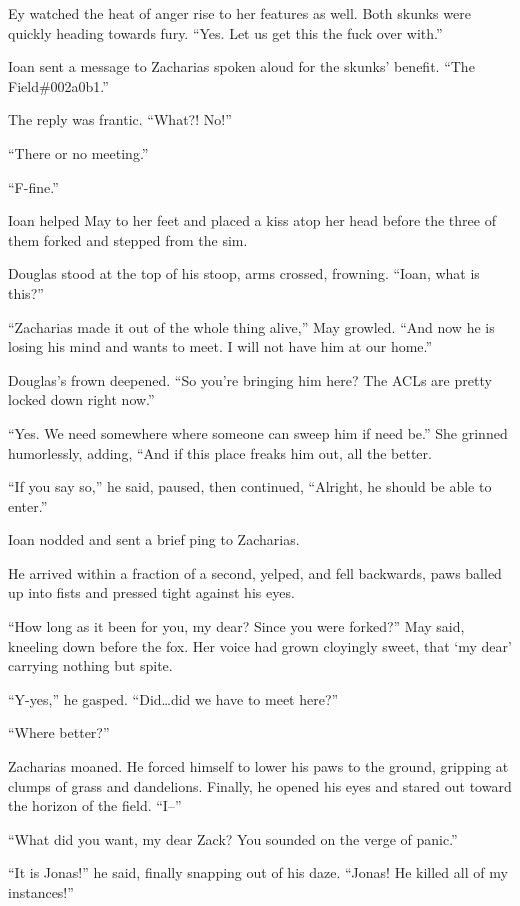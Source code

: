 Ey watched the heat of anger rise to her features as well. Both skunks were quickly heading towards fury. ``Yes. Let us get this the fuck over with.''

Ioan sent a message to Zacharias spoken aloud for the skunks' benefit. ``The Field\#002a0b1.''

The reply was frantic. ``What?! No!''

``There or no meeting.''

``F-fine.''

Ioan helped May to her feet and placed a kiss atop her head before the three of them forked and stepped from the sim.

Douglas stood at the top of his stoop, arms crossed, frowning. ``Ioan, what is this?''

``Zacharias made it out of the whole thing alive,'' May growled. ``And now he is losing his mind and wants to meet. I will not have him at our home.''

Douglas's frown deepened. ``So you're bringing him here? The ACLs are pretty locked down right now.''

``Yes. We need somewhere where someone can sweep him if need be.'' She grinned humorlessly, adding, ``And if this place freaks him out, all the better.

``If you say so,'' he said, paused, then continued, ``Alright, he should be able to enter.''

Ioan nodded and sent a brief ping to Zacharias.

He arrived within a fraction of a second, yelped, and fell backwards, paws balled up into fists and pressed tight against his eyes.

``How long as it been for you, my dear? Since you were forked?'' May said, kneeling down before the fox. Her voice had grown cloyingly sweet, that `my dear' carrying nothing but spite.

``Y-yes,'' he gasped. ``Did\ldots did we have to meet here?''

``Where better?''

Zacharias moaned. He forced himself to lower his paws to the ground, gripping at clumps of grass and dandelions. Finally, he opened his eyes and stared out toward the horizon of the field. ``I--''

``What did you want, my dear Zack? You sounded on the verge of panic.''

``It is Jonas!'' he said, finally snapping out of his daze. ``Jonas! He killed all of my instances!''

